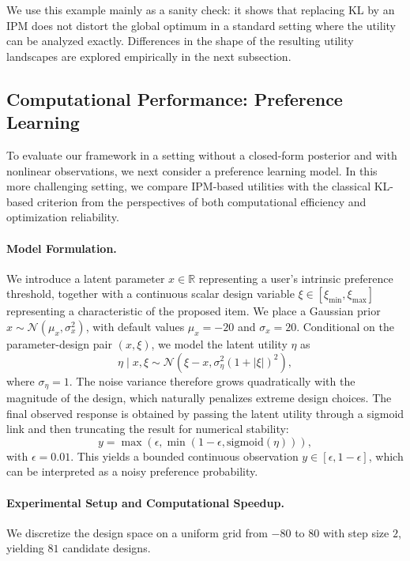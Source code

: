 \documentclass[twoside,11pt]{article}
\begin{document}
We use this example mainly as a sanity check: it shows that replacing KL by an IPM does not distort the global optimum in a standard setting where the utility can be analyzed exactly. Differences in the shape of the resulting utility landscapes are explored empirically in the next subsection.

\subsection{Computational Performance: Preference Learning}
To evaluate our framework in a setting without a closed-form posterior and with nonlinear observations, we next consider a preference learning model. In this more challenging setting, we compare IPM-based utilities with the classical KL-based criterion from the perspectives of both computational efficiency and optimization reliability.


\paragraph{Model Formulation.} We introduce a latent parameter $x \in \mathbb{R}$ representing a user's intrinsic preference threshold, together with a continuous scalar design variable $\xi \in [\xi_{\min}, \xi_{\max}]$ representing a characteristic of the proposed item. We place a Gaussian prior $x \sim \mathcal{N}(\mu_x, \sigma_x^2)$,
with default values $\mu_x = -20$ and $\sigma_x = 20$. Conditional on the parameter-design pair $(x,\xi)$, we model the latent utility $\eta$ as
\[
\eta \mid x, \xi \sim \mathcal{N}(\xi - x, \sigma_\eta^2(1 + |\xi|)^2),
\]
where $\sigma_\eta = 1$. The noise variance therefore grows quadratically with the magnitude of the design, which naturally penalizes extreme design choices. The final observed response is obtained by passing the latent utility through a sigmoid link and then truncating the result for numerical stability:
\[
y = \max(\epsilon, \min(1 - \epsilon, \mathrm{sigmoid}(\eta))),
\]
with $\epsilon = 0.01$. This yields a bounded continuous observation $y \in [\epsilon, 1-\epsilon]$, which can be interpreted as a noisy preference probability.


\paragraph{Experimental Setup and Computational Speedup.} We discretize the design space on a uniform grid from $-80$ to $80$ with step size $2$, yielding $81$ candidate designs.
\end{document}
